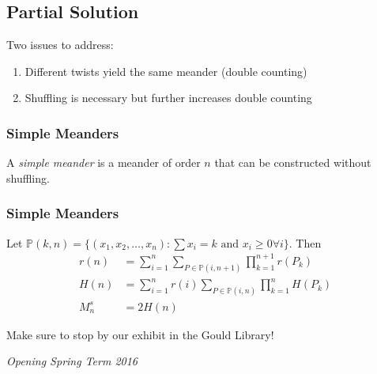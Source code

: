 \documentclass{beamer}
\begin{document}
\subsection{Partial Solution}
\begin{frame}
Two issues to address:
\begin{enumerate}
\item Different twists yield the same meander (double counting)
\item Shuffling is necessary but further increases double counting
\end{enumerate}
\end{frame}

\begin{frame}
\frametitle{Simple Meanders}
\begin{definition}
A \emph{simple meander} is a meander of order $n$ that can be constructed without shuffling.
\end{definition}
\end{frame}

\begin{frame}
\frametitle{Simple Meanders}
\renewcommand{\P}{\mathbb{P}}

\begin{theorem}
Let $\P(k,n) = \{(x_1,x_2,\ldots,x_n) : \sum x_i = k \text{ and } x_i\ge 0 \forall i\}$. Then
\begin{align*}
r(n) &= \sum_{i=1}^n\sum_{P\in\P(i,n+1)}\prod^{n+1}_{k = 1} r(P_k)\\
H(n) &= \sum_{i=1}^n r(i) \sum_{P\in\P(i,n)}\prod^{n}_{k = 1} H(P_k)\\
M^s_n &= 2H(n)
\end{align*}
\end{theorem}
\end{frame}

\begin{frame}
\begin{center}
\Huge{Make sure to stop by our exhibit in the Gould Library!}
\end{center}
\Large{\centerline{\emph{Opening Spring Term 2016}}}
\end{frame}


\end{document}
